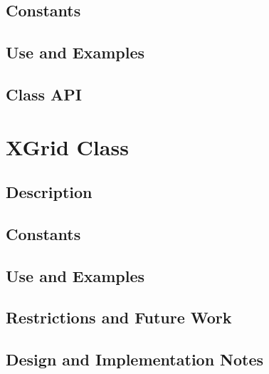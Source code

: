\documentclass[english]{article}
\begin{document}
\subsection{Constants}

\subsection{Use and Examples}

%
%
\subsection{Class API}

\section{XGrid Class}
\subsection{Description}

\subsection{Constants}

\subsection{Use and Examples}
%


\subsection{Restrictions and Future Work}

\subsection{Design and Implementation Notes}

\end{document}
